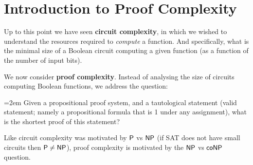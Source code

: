 \chapter{Introduction to Proof Complexity}

Up to this point we have  seen \textbf{circuit complexity}, in which we wished to understand the resources required to \emph{compute} a function. And specifically, what is the minimal size of a Boolean circuit computing a given function (as a function of the number of input bits).

We now consider \textbf{proof complexity}. Instead of analysing the size of circuits computing Boolean
functions, we address the question:



\bigskip

\noindent
\hangindent=2em
Given a propositional proof system, and a tautological
statement (valid statement; namely a propositional
formula that is 1 under any assignment), what is the
shortest proof of this statement?

\bigskip


Like circuit complexity was motivated by $\P$ vs $\NP$ (if SAT
does not have small circuits then $\P \neq \NP$), proof
complexity is motivated by the $\NP$ vs $\coNP$ question.


